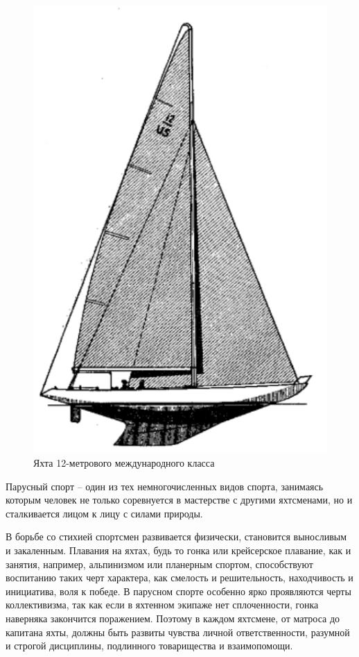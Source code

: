 \documentclass[a4paper, 12pt, twoside, final]{scrbook}
\begin{document}
\begin{figure}
\centering\includegraphics[scale=1]{Yachta_12-metrovogo_mezhdunarodnogo_klassa}
\protect\caption{Яхта 12-метрового международного класса}
\end{figure}

Парусный спорт \--- один из тех немногочисленных видов спорта, занимаясь
которым человек не только соревнуется в мастерстве с другими яхтсменами,
но и сталкивается лицом к лицу с силами природы.

В борьбе со стихией спортсмен развивается физически, становится выносливым
и закаленным. Плавания на яхтах, будь то гонка или крейсерское плавание,
как и занятия, например, альпинизмом или планерным спортом, способствуют
воспитанию таких черт характера, как смелость и решительность, находчивость
и инициатива, воля к победе. В парусном спорте особенно ярко проявляются
черты коллективизма, так как если в яхтенном экипаже нет сплоченности,
гонка наверняка закончится поражением. Поэтому в каждом яхтсмене,
от матроса до капитана яхты, должны быть развиты чувства личной ответственности,
разумной и строгой дисциплины, подлинного товарищества и взаимопомощи.
\end{document}
